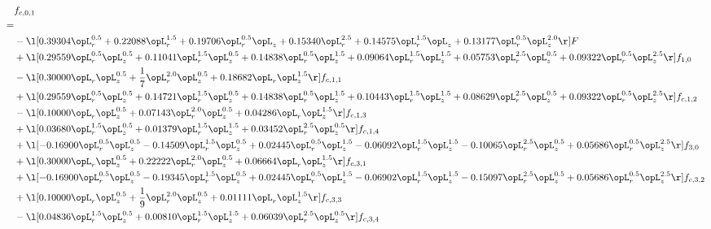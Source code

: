 \begin{alignat}{2} 
\label{eq:f_01_2} 
& f_{c,0,1} \nonumber \\ 
 = \\ 
& - \l[  0.39304 \opL_r^{0.5} +  0.22088 \opL_r^{1.5} +  0.19706 \opL_r^{0.5} \opL_z +  0.15340 \opL_r^{2.5} +  0.14575 \opL_r^{1.5} \opL_z +  0.13177 \opL_r^{0.5} \opL_z^{2.0}  \r] F \nonumber \\ 
& + \l[  0.29559 \opL_r^{0.5} \opL_z^{0.5} +  0.11041 \opL_r^{1.5} \opL_z^{0.5} +  0.14838 \opL_r^{0.5} \opL_z^{1.5} +  0.09064 \opL_r^{1.5} \opL_z^{1.5} +  0.05753 \opL_r^{2.5} \opL_z^{0.5} +  0.09322 \opL_r^{0.5} \opL_z^{2.5}  \r] f_{1,0} \nonumber \\ 
& - \l[  0.30000 \opL_r \opL_z^{0.5} + \frac{1}{7} \opL_r^{2.0} \opL_z^{0.5} +  0.18682 \opL_r \opL_z^{1.5}  \r] f_{c,1,1} \nonumber \\ 
& + \l[  0.29559 \opL_r^{0.5} \opL_z^{0.5} +  0.14721 \opL_r^{1.5} \opL_z^{0.5} +  0.14838 \opL_r^{0.5} \opL_z^{1.5} +  0.10443 \opL_r^{1.5} \opL_z^{1.5} +  0.08629 \opL_r^{2.5} \opL_z^{0.5} +  0.09322 \opL_r^{0.5} \opL_z^{2.5}  \r] f_{c,1,2} \nonumber \\ 
& - \l[  0.10000 \opL_r \opL_z^{0.5} +  0.07143 \opL_r^{2.0} \opL_z^{0.5} +  0.04286 \opL_r \opL_z^{1.5}  \r] f_{c,1,3} \nonumber \\ 
& + \l[  0.03680 \opL_r^{1.5} \opL_z^{0.5} +  0.01379 \opL_r^{1.5} \opL_z^{1.5} +  0.03452 \opL_r^{2.5} \opL_z^{0.5}  \r] f_{c,1,4} \nonumber \\ 
& + \l[  -0.16900 \opL_r^{0.5} \opL_z^{0.5}   -0.14509 \opL_r^{1.5} \opL_z^{0.5} +  0.02445 \opL_r^{0.5} \opL_z^{1.5}   -0.06092 \opL_r^{1.5} \opL_z^{1.5}   -0.10065 \opL_r^{2.5} \opL_z^{0.5} +  0.05686 \opL_r^{0.5} \opL_z^{2.5}  \r] f_{3,0} \nonumber \\ 
& + \l[  0.30000 \opL_r \opL_z^{0.5} +  0.22222 \opL_r^{2.0} \opL_z^{0.5} +  0.06664 \opL_r \opL_z^{1.5}  \r] f_{c,3,1} \nonumber \\ 
& + \l[  -0.16900 \opL_r^{0.5} \opL_z^{0.5}   -0.19345 \opL_r^{1.5} \opL_z^{0.5} +  0.02445 \opL_r^{0.5} \opL_z^{1.5}   -0.06902 \opL_r^{1.5} \opL_z^{1.5}   -0.15097 \opL_r^{2.5} \opL_z^{0.5} +  0.05686 \opL_r^{0.5} \opL_z^{2.5}  \r] f_{c,3,2} \nonumber \\ 
& + \l[  0.10000 \opL_r \opL_z^{0.5} + \frac{1}{9} \opL_r^{2.0} \opL_z^{0.5} +  0.01111 \opL_r \opL_z^{1.5}  \r] f_{c,3,3} \nonumber \\ 
& - \l[  0.04836 \opL_r^{1.5} \opL_z^{0.5} +  0.00810 \opL_r^{1.5} \opL_z^{1.5} +  0.06039 \opL_r^{2.5} \opL_z^{0.5}  \r] f_{c,3,4} \nonumber \\ 

\end{alignat}
